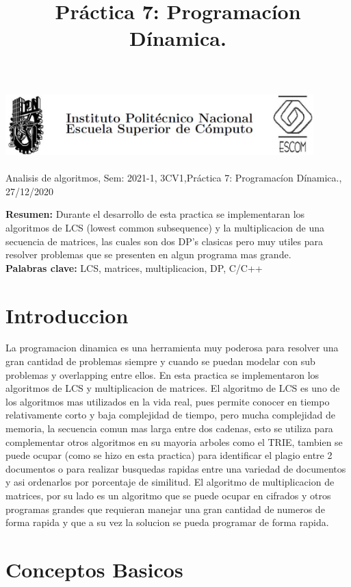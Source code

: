 \documentclass[spanish]{article}
\title {Práctica  7: Programacíon Dínamica.}
\begin{document}
	\centerline{\includegraphics[width=450px,height=100px]{header}}
	\centerline{Analisis de algoritmos, Sem: 2021-1, 3CV1,Práctica  7: Programacíon Dínamica., 27/12/2020}
	\centerline{}
	\bigskip
	\justify
	\textbf{Resumen:}	
	Durante el desarrollo de esta practica se implementaran los algoritmos de LCS (lowest common subsequence) y la multiplicacion de una secuencia de matrices, las cuales son dos DP's clasicas pero muy utiles para resolver problemas que se presenten en algun programa mas grande.\\
	\textbf{Palabras clave:}
	LCS, matrices, multiplicacion, DP, C/C++\\
	\section{Introduccion}
	La programacion dinamica es una herramienta muy poderosa para resolver una gran cantidad de problemas siempre y cuando se puedan modelar con sub problemas y overlapping entre ellos. En esta practica se implementaron los algoritmos de LCS y multiplicacion de matrices. El algoritmo de LCS es uno de los algoritmos mas utilizados en la vida real, pues permite conocer en tiempo relativamente corto y baja complejidad de tiempo, pero mucha complejidad de memoria, la secuencia comun mas larga entre dos cadenas, esto se utiliza para complementar otros algoritmos en su mayoria arboles como el TRIE, tambien se puede ocupar (como se hizo en esta practica) para identificar el plagio entre 2 documentos o para realizar busquedas rapidas entre una variedad de documentos y asi ordenarlos por porcentaje de similitud. El algoritmo de multiplicacion de matrices, por su lado es un algoritmo que se puede ocupar en cifrados y otros programas grandes que requieran manejar una gran cantidad de numeros de forma rapida y que a su vez la solucion se pueda programar de forma rapida.\\
	\section{Conceptos Basicos}
\end{document}
